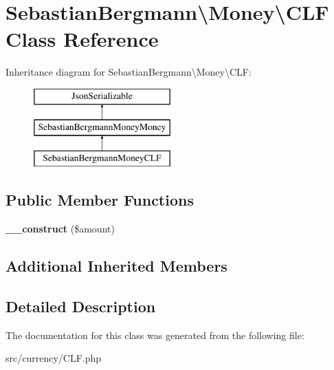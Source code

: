 \hypertarget{classSebastianBergmann_1_1Money_1_1CLF}{}\section{Sebastian\+Bergmann\textbackslash{}Money\textbackslash{}C\+L\+F Class Reference}
\label{classSebastianBergmann_1_1Money_1_1CLF}
Inheritance diagram for Sebastian\+Bergmann\textbackslash{}Money\textbackslash{}C\+L\+F\+:\begin{figure}[H]
\begin{center}
\leavevmode
\includegraphics[height=3.000000cm]{classSebastianBergmann_1_1Money_1_1CLF}
\end{center}
\end{figure}
\subsection*{Public Member Functions}
\begin{DoxyCompactItemize}
\item 
\hypertarget{classSebastianBergmann_1_1Money_1_1CLF_ac89d3a705346561ae4c66bf3dc1c9d15}{}{\bfseries \+\_\+\+\_\+construct} (\$amount)\label{classSebastianBergmann_1_1Money_1_1CLF_ac89d3a705346561ae4c66bf3dc1c9d15}

\end{DoxyCompactItemize}
\subsection*{Additional Inherited Members}


\subsection{Detailed Description}


The documentation for this class was generated from the following file\+:\begin{DoxyCompactItemize}
\item 
src/currency/C\+L\+F.\+php\end{DoxyCompactItemize}
